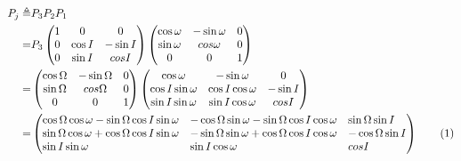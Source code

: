 \documentclass[]{article}
\newcommand\numberthis{\addtocounter{equation}{1}\tag{\theequation}}
\begin{document}
\begin{align*}
P_j \triangleq& P_3 P_2 P_1\\
 =& P_3 \begin{pmatrix}
1 & 0 & 0\\
0 & \cos I & - \sin I\\
0 & \sin I & cos I
\end{pmatrix}
\begin{pmatrix}
\cos \omega & - \sin \omega & 0\\
\sin \omega & cos \omega & 0\\
0 & 0  & 1
\end{pmatrix} \\
=& \begin{pmatrix}
\cos \Omega & - \sin \Omega & 0\\
\sin \Omega & cos \Omega & 0\\
0 & 0  & 1
\end{pmatrix}
\begin{pmatrix}
\cos \omega & -\sin \omega & 0\\
\cos I \sin \omega & \cos I \cos \omega & - \sin I\\
\sin I \sin \omega & \sin I \cos \omega & cos I
\end{pmatrix}\\
=&\begin{pmatrix*}[l]
\cos \Omega \cos \omega - \sin \Omega \cos I \sin \omega&-\cos \Omega \sin \omega - \sin \Omega \cos I \cos \omega& \sin \Omega \sin I\\
\sin \Omega \cos \omega + \cos \Omega \cos I \sin \omega& - \sin \Omega \sin \omega + \cos \Omega \cos I \cos \omega& - \cos \Omega \sin I \\
\sin I \sin \omega & \sin I \cos \omega & cos I
\end{pmatrix*}\numberthis
\end{align*}
\end{document}
